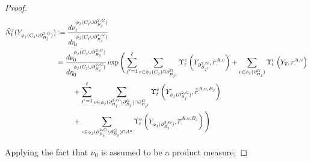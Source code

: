 \documentclass[12pt]{article}
\newcommand{\ov}{\overline}
\newcommand{\defeq}{:=}								%
\newcommand{\gneigh}[2]{\partial^{#1}_{#2}}			%
\newcommand{\dgneigh}[2]{\partial^{2,#1}_{#2}}		%
\newcommand{\cl}[1]{\ov{#1}}						%
\newcommand{\rate}{r}								%
\newcommand{\vind}[1]{_{#1}}						%
\newcommand{\vpara}[1]{^{#1}}						%
\newcommand{\stpara}[1]{_{#1}}						%
\newcommand{\tpara}[1]{_{#1}}						%
\newcommand{\gvpara}[2]{^{#1,#2}}					%
\newcommand{\psize}{\ell}							%
\newcommand{\Xg}{Y}									%
\newcommand{\brate}{\alt{\rate}}					%
\newcommand{\inte}[1]{{#1}^\mathrm{o}}				%
\newcommand{\alt}[1]{\tilde{#1}}					%
\newcommand{\mm}{\nu}								%
\newcommand{\bgrate}{\ov{\rate}}					%
\newcommand{\bcrate}{\hat{\brate}}					%
\newcommand{\mmm}{\eta}								%
\newcommand{\ds}{\Upsilon}							%
\newcommand{\denseph}{\alt{N}}						%
\newcommand{\gvjpara}[3]{^{#1,#2,#3}}				%
\newcommand{\jpara}[1]{^{#1}}						%
\begin{document}
\begin{proof}
\begin{align*}
\denseph\jpara{j}\tpara{t}(\Xg\vind{\phi_j(C_j\cup \dgneigh{G}{B_j})}) &\defeq \frac{d\mm\vpara{\phi_j(C_j\cup \dgneigh{G}{B_j})}\tpara{t}}{d\mmm\vpara{\phi_j(C_j\cup \dgneigh{G}{B_j})}\tpara{t}}\\
&= \frac{d\mm\vpara{\phi_j(C_j\cup \dgneigh{G}{B_j})}\tpara{0}}{d\mmm\vpara{\phi_j(C_j\cup \dgneigh{G}{B_j})}\tpara{0}}\exp\Bigg(\sum_{j' = 1}^{\psize}\sum_{v \in \phi_j(C_j)\cap\gneigh{G}{B_{j'}}} \ds\vpara{v}\tpara{t}\left(\Xg\vind{\dgneigh{G}{B_{j'}}},\brate\gvpara{A}{v}\stpara{\cdot}\right) + \sum_{v \in \phi_j(\gneigh{G}{B_j})} \ds\vpara{v}\tpara{t}\left(\Xg\vind{\cl{v}},\rate\gvpara{A}{v}\stpara{\cdot}\right)\\
&\hspace{24pt} + \sum_{j'=1}^\psize \sum_{v \in \phi_j(\dgneigh{G}{B_j}\setminus\gneigh{G}{B_j})\cap \gneigh{G}{B_{j'}}} \ds\vpara{v}\tpara{t}\left(\Xg\vind{\phi_j(\dgneigh{G}{B_j})},\bcrate\gvjpara{A}{v}{B_j}\stpara{\cdot}\right)\\
&\hspace{24 pt} + \sum_{v \in \phi_j(\dgneigh{G}{B_j}\setminus\gneigh{G}{B_j})\cap\inte{A}} \ds\vpara{v}\tpara{t}\left(\Xg\vind{\phi_j(\dgneigh{G}{B_j})},\bgrate\gvjpara{A}{v}{B_j}\stpara{\cdot}\right)\Bigg)
\end{align*}

Applying the fact that \(\mm\tpara{0}\) is assumed to be a product measure,


\end{proof}
\end{document}
